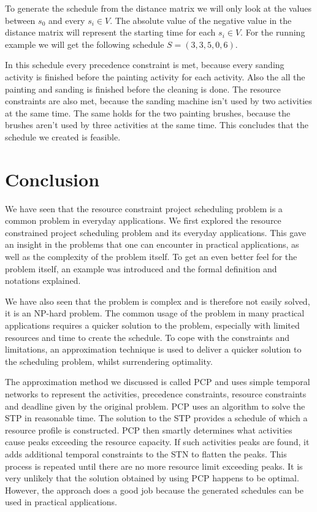 \documentclass{article}
\theoremstyle{definition}
\begin{document}
To generate the schedule from the distance matrix we will only look at the values between $s_0$ and every $s_i \in V$.
The absolute value of the negative value in the distance matrix will represent the starting time for each $s_i \in V$.
For the running example we will get the following schedule $S = (3, 3, 5, 0, 6)$.

In this schedule every precedence constraint is met, because every sanding activity is finished before the painting activity for each activity. 
Also the all the painting and sanding is finished before the cleaning is done.
The resource constraints are also met, because the sanding machine isn't used by two activities at the same time.
The same holds for the two painting brushes, because the brushes aren't used by three activities at the same time.
This concludes that the schedule we created is feasible.

\newpage
 
\section{Conclusion}

We have seen that the resource constraint project scheduling problem is a common problem in everyday applications.
We first explored the resource constrained project scheduling problem and its everyday applications.
This gave an insight in the problems that one can encounter in practical applications, as well as the complexity of the problem itself.
To get an even better feel for the problem itself, an example was introduced and the formal definition and notations explained.

We have also seen that the problem is complex and is therefore not easily solved, it is an NP-hard problem.
The common usage of the problem in many practical applications requires a quicker solution to the problem, especially with limited resources and time to create the schedule.
To cope with the constraints and limitations, an approximation technique is used to deliver a quicker solution to the scheduling problem, whilst surrendering optimality.

The approximation method we discussed is called PCP and uses simple temporal networks to represent the activities, precedence constraints, resource constraints and deadline given by the original problem. 
PCP uses an algorithm to solve the STP in reasonable time. 
The solution to the STP provides a schedule of which a resource profile is constructed. 
PCP then smartly determines what activities cause peaks exceeding the resource capacity. 
If such activities peaks are found, it adds additional temporal constraints to the STN to flatten the peaks. 
This process is repeated until there are no more resource limit exceeding peaks. 
It is very unlikely that the solution obtained by using PCP happens to be optimal. 
However, the approach does a good job because the generated schedules can be used in practical applications. 
\end{document}
